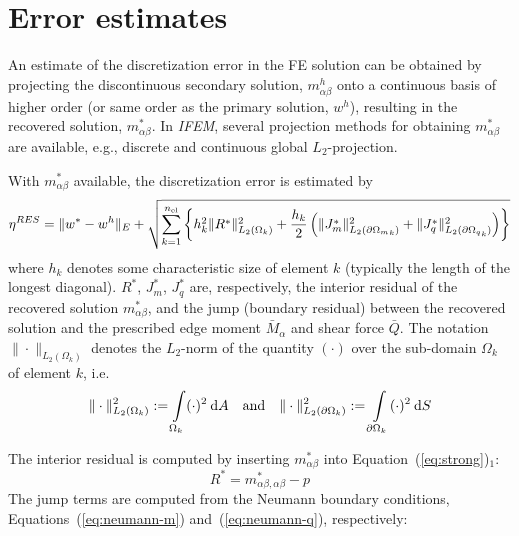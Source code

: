 \documentclass{article}
\def\dV{\:{\rm d}A}
\def\dA{\:{\rm d}S}
\begin{document}
\section{Error estimates}

An estimate of the discretization error in the FE solution can be obtained by
projecting the discontinuous secondary solution, $m_{\alpha\beta}^h$ onto a
continuous basis of higher order (or same order as the primary solution, $w^h$),
resulting in the recovered solution, $m_{\alpha\beta}^*$.
In {\sl IFEM}, several projection methods for obtaining $m_{\alpha\beta}^*$ are
available, e.g., discrete and continuous global $L_2$-projection.

With $m_{\alpha\beta}^*$ available, the discretization error is estimated by
%
\begin{equation}
  \label{eq:error estimate}
  \eta^{RES} = \|w^*-w^h\|_E +
  \sqrt{\sum_{k=1}^{n_{\rm el}}\left\{h_k^2\|R^*\|_{L_2(\Omega_k)}^2 +
    \frac{h_k}{2}\left(\|J_m^*\|_{L_2(\partial{\Omega_m}_k)}^2 +
                       \|J_q^*\|_{L_2(\partial{\Omega_q}_k)}^2\right)\right\}}
\end{equation}
%
where $h_k$ denotes some characteristic size of element $k$ (typically the
length of the longest diagonal). $R^*$, $J_m^*$, $J_q^*$ are, respectively,
the interior residual of the recovered solution $m_{\alpha\beta}^*$,
and the jump (boundary residual) between the recovered solution and the
prescribed edge moment $\bar{M}_\alpha$ and shear force $\bar{Q}$.
The notation $\|\cdot\|_{L_2(\Omega_k)}$ denotes the $L_2$-norm of the quantity
$(\cdot)$ over the sub-domain $\Omega_k$ of element $k$, i.e.
%
\begin{equation}
  \|\cdot\|_{L_2(\Omega_k)}^2 := \int\limits_{\Omega_k} (\cdot)^2\dV
  \quad\mbox{and}\quad
  \|\cdot\|_{L_2(\partial\Omega_k)}^2 := \int\limits_{\partial\Omega_k} (\cdot)^2\dA
\end{equation}

The interior residual is computed by inserting $m_{\alpha\beta}^*$ into
Equation~(\ref{eq:strong})$_1$:
%
\begin{equation}
  R^* = m_{\alpha\beta,\alpha\beta}^* - p
\end{equation}
%
The jump terms are computed from the Neumann boundary conditions,
Equations~(\ref{eq:neumann-m}) and~(\ref{eq:neumann-q}), respectively:
\end{document}
